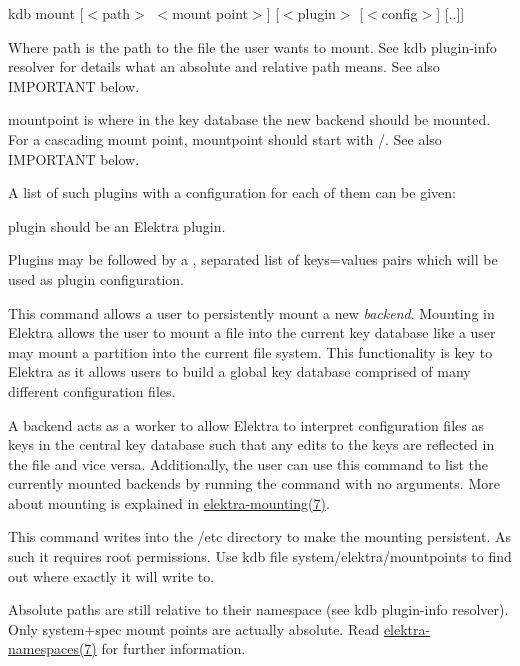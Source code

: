 {\ttfamily kdb mount \mbox{[}$<$path$>$ $<$mount point$>$\mbox{]} \mbox{[}$<$plugin$>$ \mbox{[}$<$config$>$\mbox{]} \mbox{[}..\mbox{]}\mbox{]}}~\newline



\begin{DoxyItemize}
\item Where {\ttfamily path} is the path to the file the user wants to mount. See {\ttfamily kdb plugin-\/info resolver} for details what an absolute and relative path means. See also I\+M\+P\+O\+R\+T\+A\+NT below.
\item {\ttfamily mountpoint} is where in the key database the new backend should be mounted. For a cascading mount point, {\ttfamily mountpoint} should start with {\ttfamily /}. See also I\+M\+P\+O\+R\+T\+A\+NT below.
\item A list of such plugins with a configuration for each of them can be given\+:
\begin{DoxyItemize}
\item {\ttfamily plugin} should be an Elektra plugin.
\item Plugins may be followed by a {\ttfamily ,} separated list of {\ttfamily keys=values} pairs which will be used as plugin configuration.
\end{DoxyItemize}
\end{DoxyItemize}

This command allows a user to persistently mount a new {\itshape backend}. Mounting in Elektra allows the user to mount a file into the current key database like a user may mount a partition into the current file system. This functionality is key to Elektra as it allows users to build a global key database comprised of many different configuration files.

A backend acts as a worker to allow Elektra to interpret configuration files as keys in the central key database such that any edits to the keys are reflected in the file and vice versa. Additionally, the user can use this command to list the currently mounted backends by running the command with no arguments. More about mounting is explained in \mbox{\hyperlink{doc_help_elektra-mounting_md}{elektra-\/mounting(7)}}.

This command writes into the {\ttfamily /etc} directory to make the mounting persistent. As such it requires root permissions. Use {\ttfamily kdb file system/elektra/mountpoints} to find out where exactly it will write to.

Absolute paths are still relative to their namespace (see {\ttfamily kdb plugin-\/info resolver}). Only system+spec mount points are actually absolute. Read \mbox{\hyperlink{doc_help_elektra-namespaces_md}{elektra-\/namespaces(7)}} for further information.

